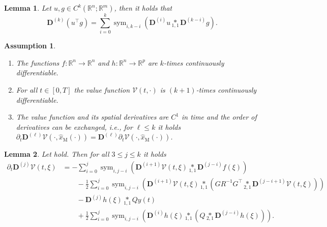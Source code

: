 \documentclass[10pt,a4paper]{amsart}
\newtheorem{lemma}{Lemma}
\newtheorem{assumption}{Assumption}
\newcommand{\R}{\mathbb{R}}
\DeclareMathOperator{\Sym}{sym}
\newcommand{\TenDeriv}[1]{\mathbf{D}^{(#1)}}
\newcommand{\tenp}[2]{\underset{#1,#2}{*}}
\begin{document}
\begin{lemma}\label{LEM:ProductRule}
Let $u,g\in C^k(\R^n;\R^m)$, then it holds that
  \begin{equation}\label{EQ:ProductRule}
    \TenDeriv{k}(u^\top g) = \sum_{i=0}^{k} \Sym_{i,k-i}\left( \TenDeriv{i}u \tenp{1}{1} \TenDeriv{k-i}g \right).
  \end{equation}
\end{lemma}

\begin{assumption}~ \label{ass:smoothness}
    \begin{enumerate}
        \item The functions $f \colon \mathbb{R}^n \to \mathbb{R}^n$ and $h \colon \mathbb{R}^n \to \mathbb{R}^p$ are $k$-times continuously differentiable.
        \item For all $t \in [0,T]$ the value function $\mathcal{V}(t,\cdot)$ is $(k+1)$-times continuously differentiable.
        \item The value function and its spatial derivatives are $C^1$ in time and the order of derivatives can be exchanged, i.e., for $\ell \leq k $ it holds
        $ \partial_t \TenDeriv{\ell} \mathcal{V}(\cdot,\widehat{x}_\mathrm{M}(\cdot)) = \TenDeriv{\ell} \partial_t \mathcal{V}(\cdot,\widehat{x}_\mathrm{M}(\cdot)) $.
    \end{enumerate}
\end{assumption}

\begin{lemma}\label{LEM:HigherDerivativeHJB}
    Let  hold. Then for all $3 \leq j \leq k$ it holds
    \begin{equation}
    \begin{aligned}\label{EQ:HigherDerivativeHJB}
        \partial_t \TenDeriv{j} \mathcal{V}(t,\xi) &= -\sum_{i=0}^{j} \Sym_{i,j-i}\left( \TenDeriv{i+1} \mathcal{V}(t,\xi) \tenp{1}{1}\TenDeriv{j-i}f(\xi) \right)
        \\ 
        &\qquad - \frac{1}{2}\sum_{i=0}^{j} \Sym_{i,j-i}\left( \TenDeriv{i+1} \mathcal{V}(t,\xi) \tenp{1}{1} \left( G R^{-1}G^\top \tenp{2}{1}\TenDeriv{j-i+1} \mathcal{V}(t,\xi) \right) \right)
        \\
        &\qquad - \TenDeriv{j} h(\xi) \tenp{1}{1} Q y(t) 
        \\
        & \qquad + \frac{1}{2} \sum_{i=0}^{j} \Sym_{i,j-i} \left(\TenDeriv{i} h(\xi) \tenp{1}{1} \left(Q \tenp{2}{1} \TenDeriv{j-i} h(\xi)\right) \right).
    \end{aligned}
    \end{equation}
\end{lemma}
\end{document}
